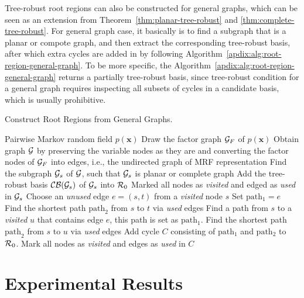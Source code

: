 Tree-robust root regions can also be constructed for general graphs, which can be seen as an extension from Theorem~\ref{thm:planar-tree-robust} and \ref{thm:complete-tree-robust}. For general graph case, it basically is to find a subgraph that is a planar or compote graph, and then extract the corresponding tree-robust basis, after which extra cycles are added in by following Algorithm~\ref{apdix:alg:root-region-general-graph}. To be more specific, the Algorithm~\ref{apdix:alg:root-region-general-graph} returns a partially tree-robust basis, since tree-robust condition for a general graph requires inspecting all subsets of cycles in a candidate basis, which is usually prohibitive. 
\begin{algorithm}[tb]
  \caption{Construct Root Regions from General Graphs.}
  \label{apdix:alg:root-region-general-graph}
  \begin{algorithmic}
     Pairwise Markov random field $p(\bm{x})$
    \STATE Draw the factor graph $\mathcal{G}_F$ of $p(\bm{x})$
    \STATE Obtain graph $\mathcal{G}$ by preserving the variable nodes as they are and converting the factor nodes of $\mathcal{G}_F$ into edges, i.e., the undirected graph of MRF representation
    \STATE Find the subgraph $\mathcal{G}_s$ of $\mathcal{G}$, such that $\mathcal{G}_s$ is planar or complete graph
    \STATE Add the tree-robust basis $\mathcal{C}\mathcal{B}(\mathcal{G}_s)$ of $\mathcal{G}_s$ into $\mathcal{R}_0$
    \STATE Marked all nodes as \textit{visited} and edged as \textit{used} in $\mathcal{G}_s$
    \REPEAT
    \STATE Choose an \textit{unused} edge $e = (s,t)$ from a \textit{visited} node $s$
    \STATE Set $\mathrm{path_1} = e$
    \STATE Find the shortest path $\mathrm{path}_2$ from $s$ to $t$
    via \textit{used} edges
    \ELSE
    \STATE Find a path from $s$ to a \textit{visited} $u$ that
    contains edge $e$, this path is set as $\mathrm{path_1}$.
    \STATE Find the shortest path $\mathrm{path}_2$ from $s$ to $u$
    via \textit{used} edges
    \ENDIF
    \STATE Add cycle $C$ consisting of $\mathrm{path_1}$ and
    $\mathrm{path_2}$ to $\mathcal{R}_0$.
    \STATE Mark all nodes as \textit{visited} and edges as
    \textit{used} in $C$
  \end{algorithmic}
\end{algorithm}





\section{Experimental Results}\label{chpt4:sec:experiments}

